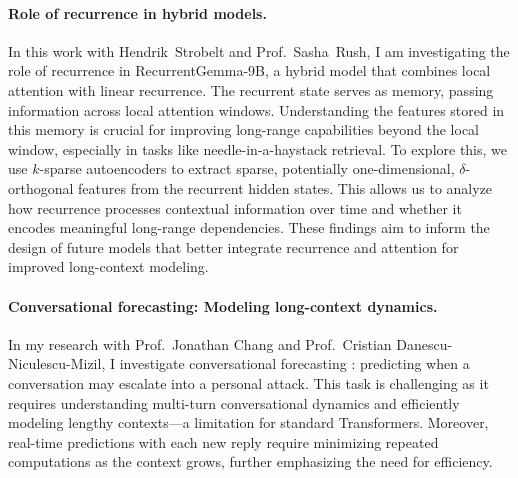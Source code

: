 
\paragraph{Role of recurrence in hybrid models.}

In this work with Hendrik~Strobelt and Prof.~Sasha~Rush, I am investigating the role of recurrence in RecurrentGemma-$9$B, a hybrid model that combines local attention with linear recurrence.
%
The recurrent state serves as memory, passing information across local attention windows.
%
Understanding the features stored in this memory is crucial for improving long-range capabilities beyond the local window, especially in tasks like needle-in-a-haystack retrieval.
%
To explore this, we use $k$-sparse autoencoders to extract sparse, potentially one-dimensional, $\delta$-orthogonal features from the recurrent hidden states.
%
This allows us to analyze how recurrence processes contextual information over time and whether it encodes meaningful long-range dependencies.
% 
These findings aim to inform the design of future models that better integrate recurrence and attention for improved long-context modeling.



\paragraph{Conversational forecasting: Modeling long-context dynamics.}

In my research with Prof.~Jonathan Chang and Prof.~Cristian Danescu-Niculescu-Mizil, I investigate conversational forecasting \citep{chang_trouble_2019}: predicting when a conversation may escalate into a personal attack.
%
This task is challenging as it requires understanding multi-turn conversational dynamics and efficiently modeling lengthy contexts---a limitation for standard Transformers.
%
Moreover, real-time predictions with each new reply require minimizing repeated computations as the context grows, further emphasizing the need for efficiency.

